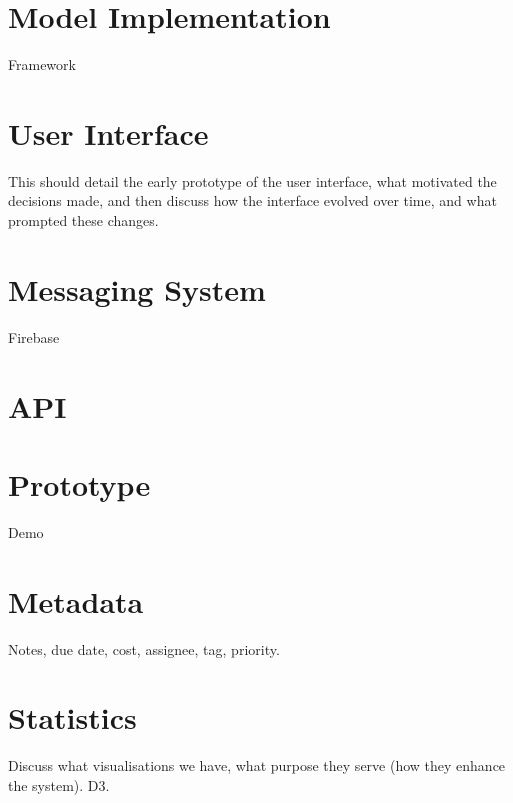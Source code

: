 \documentclass[a4paper]{l3proj}
\begin{document}
\section{Model Implementation}

Framework

\section{User Interface}

This should detail the early prototype of the user interface, what motivated the decisions made, 
and then discuss how the interface evolved over time, and what prompted these changes.

\section{Messaging System}

Firebase

\section{API}


\section{Prototype}

Demo

\section{Metadata}

Notes, due date, cost, assignee, tag, priority.

\section{Statistics}

Discuss what visualisations we have, what purpose they serve (how they enhance the system).
D3.
	
\end{document}
